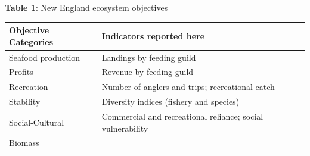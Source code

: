 \documentclass[11pt,]{article}
\begin{document}
\textbf{Table 1}: New England ecosystem objectives

\begin{longtable}[]{@{}ll@{}}
\toprule
\begin{minipage}[b]{0.29\columnwidth}\raggedright
Objective Categories\strut
\end{minipage} & \begin{minipage}[b]{0.65\columnwidth}\raggedright
Indicators reported here\strut
\end{minipage}\tabularnewline
\midrule
\endhead
\begin{minipage}[t]{0.29\columnwidth}\raggedright
Seafood production\strut
\end{minipage} & \begin{minipage}[t]{0.65\columnwidth}\raggedright
Landings by feeding guild\strut
\end{minipage}\tabularnewline
\begin{minipage}[t]{0.29\columnwidth}\raggedright
Profits\strut
\end{minipage} & \begin{minipage}[t]{0.65\columnwidth}\raggedright
Revenue by feeding guild\strut
\end{minipage}\tabularnewline
\begin{minipage}[t]{0.29\columnwidth}\raggedright
Recreation\strut
\end{minipage} & \begin{minipage}[t]{0.65\columnwidth}\raggedright
Number of anglers and trips; recreational catch\strut
\end{minipage}\tabularnewline
\begin{minipage}[t]{0.29\columnwidth}\raggedright
Stability\strut
\end{minipage} & \begin{minipage}[t]{0.65\columnwidth}\raggedright
Diversity indices (fishery and species)\strut
\end{minipage}\tabularnewline
\begin{minipage}[t]{0.29\columnwidth}\raggedright
Social-Cultural\strut
\end{minipage} & \begin{minipage}[t]{0.65\columnwidth}\raggedright
Commercial and recreational reliance; social vulnerability\strut
\end{minipage}\tabularnewline
\begin{minipage}[t]{0.29\columnwidth}\raggedright
Biomass\strut
\end{minipage} & \begin{minipage}[t]{0.65\columnwidth}\raggedright

\end{minipage}
\end{longtable}
\end{document}
